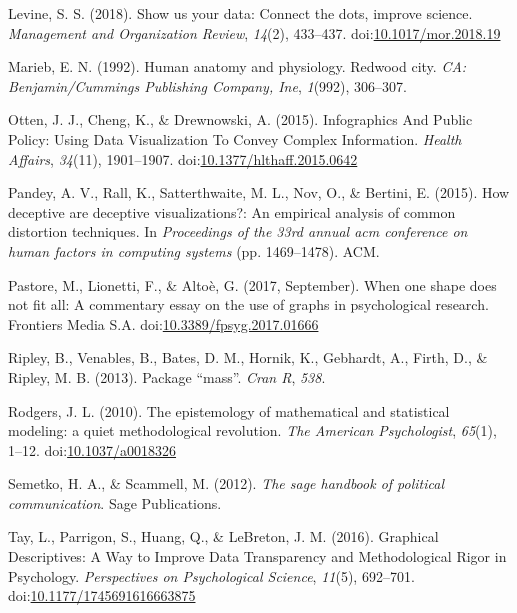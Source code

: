 \documentclass[
  man]{apa6}
\newlength{\cslhangindent}
\newenvironment{cslreferences}%
  {\setlength{\parindent}{0pt}%
  \everypar{\setlength{\hangindent}{\cslhangindent}}\ignorespaces}%
  {\par}
\begin{document}
\begin{cslreferences}
\leavevmode\hypertarget{ref-Levine2018}{}%
Levine, S. S. (2018). Show us your data: Connect the dots, improve science. \emph{Management and Organization Review}, \emph{14}(2), 433--437. doi:\href{https://doi.org/10.1017/mor.2018.19}{10.1017/mor.2018.19}

\leavevmode\hypertarget{ref-marieb1992human}{}%
Marieb, E. N. (1992). Human anatomy and physiology. Redwood city. \emph{CA: Benjamin/Cummings Publishing Company, Ine}, \emph{1}(992), 306--307.

\leavevmode\hypertarget{ref-Otten2015}{}%
Otten, J. J., Cheng, K., \& Drewnowski, A. (2015). Infographics And Public Policy: Using Data Visualization To Convey Complex Information. \emph{Health Affairs}, \emph{34}(11), 1901--1907. doi:\href{https://doi.org/10.1377/hlthaff.2015.0642}{10.1377/hlthaff.2015.0642}

\leavevmode\hypertarget{ref-pandey2015deceptive}{}%
Pandey, A. V., Rall, K., Satterthwaite, M. L., Nov, O., \& Bertini, E. (2015). How deceptive are deceptive visualizations?: An empirical analysis of common distortion techniques. In \emph{Proceedings of the 33rd annual acm conference on human factors in computing systems} (pp. 1469--1478). ACM.

\leavevmode\hypertarget{ref-Pastore2017}{}%
Pastore, M., Lionetti, F., \& Altoè, G. (2017, September). When one shape does not fit all: A commentary essay on the use of graphs in psychological research. Frontiers Media S.A. doi:\href{https://doi.org/10.3389/fpsyg.2017.01666}{10.3389/fpsyg.2017.01666}

\leavevmode\hypertarget{ref-ripley2013package}{}%
Ripley, B., Venables, B., Bates, D. M., Hornik, K., Gebhardt, A., Firth, D., \& Ripley, M. B. (2013). Package ``mass''. \emph{Cran R}, \emph{538}.

\leavevmode\hypertarget{ref-rodgers_epistemology_2010}{}%
Rodgers, J. L. (2010). The epistemology of mathematical and statistical modeling: a quiet methodological revolution. \emph{The American Psychologist}, \emph{65}(1), 1--12. doi:\href{https://doi.org/10.1037/a0018326}{10.1037/a0018326}

\leavevmode\hypertarget{ref-semetko2012sage}{}%
Semetko, H. A., \& Scammell, M. (2012). \emph{The sage handbook of political communication}. Sage Publications.

\leavevmode\hypertarget{ref-Tay2016a}{}%
Tay, L., Parrigon, S., Huang, Q., \& LeBreton, J. M. (2016). Graphical Descriptives: A Way to Improve Data Transparency and Methodological Rigor in Psychology. \emph{Perspectives on Psychological Science}, \emph{11}(5), 692--701. doi:\href{https://doi.org/10.1177/1745691616663875}{10.1177/1745691616663875}


\end{cslreferences}
\end{document}
